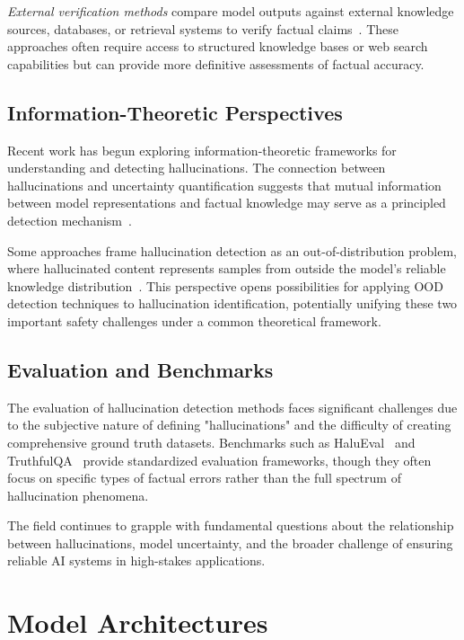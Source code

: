 \documentclass[11pt, oneside]{book}
\theoremstyle{plain}
\theoremstyle{definition}
\theoremstyle{remark}
\begin{document}
\emph{External verification methods} compare model outputs against external knowledge sources, databases, or retrieval systems to verify factual claims~\citep{peng2023check,chern2023factool}. These approaches often require access to structured knowledge bases or web search capabilities but can provide more definitive assessments of factual accuracy.

\subsection{Information-Theoretic Perspectives}

Recent work has begun exploring information-theoretic frameworks for understanding and detecting hallucinations. The connection between hallucinations and uncertainty quantification suggests that mutual information between model representations and factual knowledge may serve as a principled detection mechanism~\citep{farquhar2024detecting}.

Some approaches frame hallucination detection as an out-of-distribution problem, where hallucinated content represents samples from outside the model's reliable knowledge distribution~\citep{burns2023discovering}. This perspective opens possibilities for applying OOD detection techniques to hallucination identification, potentially unifying these two important safety challenges under a common theoretical framework.

\subsection{Evaluation and Benchmarks}

The evaluation of hallucination detection methods faces significant challenges due to the subjective nature of defining "hallucinations" and the difficulty of creating comprehensive ground truth datasets. Benchmarks such as HaluEval~\citep{li2023halueval} and TruthfulQA~\citep{lin2022truthfulqa} provide standardized evaluation frameworks, though they often focus on specific types of factual errors rather than the full spectrum of hallucination phenomena.

The field continues to grapple with fundamental questions about the relationship between hallucinations, model uncertainty, and the broader challenge of ensuring reliable AI systems in high-stakes applications.

\section{Model Architectures}
\end{document}
